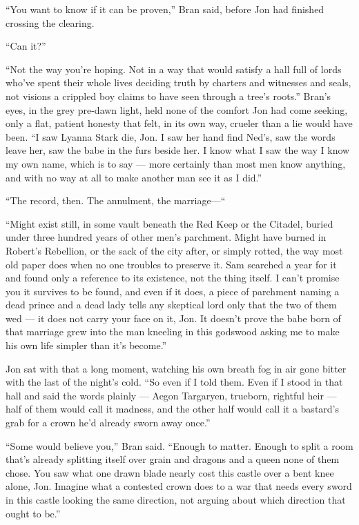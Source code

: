 “You want to know if it can be proven,” Bran said, before Jon had finished crossing the clearing.

“Can it?”

“Not the way you’re hoping. Not in a way that would satisfy a hall full of lords who’ve spent their whole lives deciding truth by charters and witnesses and seals, not visions a crippled boy claims to have seen through a tree’s roots.” Bran’s eyes, in the grey pre-dawn light, held none of the comfort Jon had come seeking, only a flat, patient honesty that felt, in its own way, crueler than a lie would have been. “I saw Lyanna Stark die, Jon. I saw her hand find Ned’s, saw the words leave her, saw the babe in the furs beside her. I know what I saw the way I know my own name, which is to say — more certainly than most men know anything, and with no way at all to make another man see it as I did.”

“The record, then. The annulment, the marriage—“

“Might exist still, in some vault beneath the Red Keep or the Citadel, buried under three hundred years of other men’s parchment. Might have burned in Robert’s Rebellion, or the sack of the city after, or simply rotted, the way most old paper does when no one troubles to preserve it. Sam searched a year for it and found only a reference to its existence, not the thing itself. I can’t promise you it survives to be found, and even if it does, a piece of parchment naming a dead prince and a dead lady tells any skeptical lord only that the two of them wed — it does not carry your face on it, Jon. It doesn’t prove the babe born of that marriage grew into the man kneeling in this godswood asking me to make his own life simpler than it’s become.”

Jon sat with that a long moment, watching his own breath fog in air gone bitter with the last of the night’s cold. “So even if I told them. Even if I stood in that hall and said the words plainly — Aegon Targaryen, trueborn, rightful heir — half of them would call it madness, and the other half would call it a bastard’s grab for a crown he’d already sworn away once.”

“Some would believe you,” Bran said. “Enough to matter. Enough to split a room that’s already splitting itself over grain and dragons and a queen none of them chose. You saw what one drawn blade nearly cost this castle over a bent knee alone, Jon. Imagine what a contested crown does to a war that needs every sword in this castle looking the same direction, not arguing about which direction that ought to be.”

